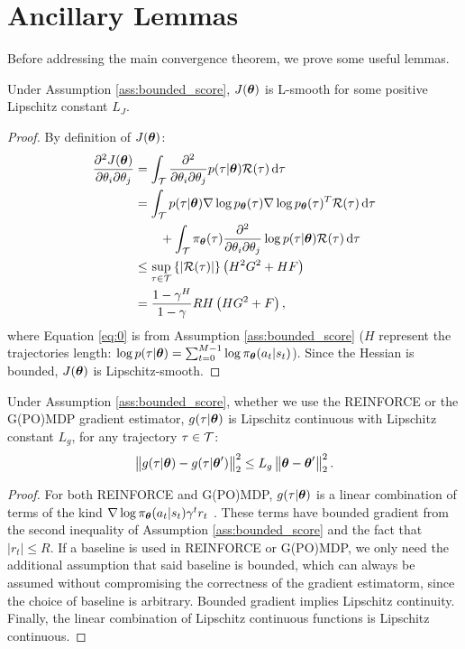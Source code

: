 \section{Ancillary Lemmas}\label{sec:ancillarylemmas}

Before addressing the main convergence theorem, we prove some useful lemmas.


\begin{lemma}\label{lemma:lsmooth}
	Under Assumption \ref{ass:bounded_score}, $J(\vtheta)$ is L-smooth for some positive Lipschitz constant $L_J$.
\end{lemma}
\begin{proof}
	By definition of $J(\vtheta)$:
	\begin{align}
	\Dij{J(\vtheta)}{\theta} 
	&= \int_{\Tspace}\Dij{}{\theta}p(\tau|\vtheta)\Reward(\tau)\de \tau
	\nonumber\\ 
	&= \int_{\Tspace}p(\tau|\vtheta)\score{\vtheta}{\tau}\score{\vtheta}{\tau}^T\Reward(\tau)\de \tau\\ 
	&\qquad+ \int_{\Tspace}\pol(\tau)\Dij{}{\theta}\log p(\tau|\vtheta)\Reward(\tau)\de \tau \nonumber\\
	&\leq \sup_{\tau \in \mathcal{T}} \left\{\left|\Reward(\tau)\right|\right\} \left(H^2\GRADLOG^2+H\HESSLOG\right) \label{eq:0}\\
	&= \frac{1-\gamma^H}{1-\gamma}RH\left(H\GRADLOG^2+\HESSLOG\right),\nonumber
	\end{align}
	where Equation \ref{eq:0} is from Assumption \ref{ass:bounded_score} ($H$ represent the trajectories length: $\log p(\tau|\vtheta) = \sum_{t=0}^{M-1}\log\pi_{\vtheta}(a_t\vert s_t)$).
	Since the Hessian is bounded, $J(\vtheta)$ is Lipschitz-smooth.
\end{proof}

\begin{lemma}\label{lemma:gsmooth}
	Under Assumption \ref{ass:bounded_score}, whether we use the REINFORCE or the G(PO)MDP gradient estimator, $g(\tau\vert\vtheta)$ is Lipschitz continuous with Lipschitz constant $L_g$, \ie for any trajectory $\tau\in\Tspace$:
	\[
	\norm[2]{g(\tau\vert\vtheta)-g(\tau\vert\vtheta')}^2 \leq L_g\norm[2]{\vtheta-\vtheta'}^2.
	\]
\end{lemma}
\begin{proof}
	For both REINFORCE and G(PO)MDP, $g(\tau\vert\vtheta)$ is a linear combination of terms of the kind $\nabla \log \pi_{\vtheta}(a_t\vert s_t)\gamma^t r_t$ \citep{peters2008reinforcement}. These terms have bounded gradient from the second inequality of Assumption \ref{ass:bounded_score} and the fact that $|r_t|\leq R$. If a baseline is used in REINFORCE or G(PO)MDP, we only need the additional assumption that said baseline is bounded, which can always be assumed without compromising the correctness of the gradient estimatorm, since the choice of baseline is arbitrary.
	Bounded gradient implies Lipschitz continuity. Finally, the linear combination of Lipschitz continuous functions is Lipschitz continuous.
\end{proof}

